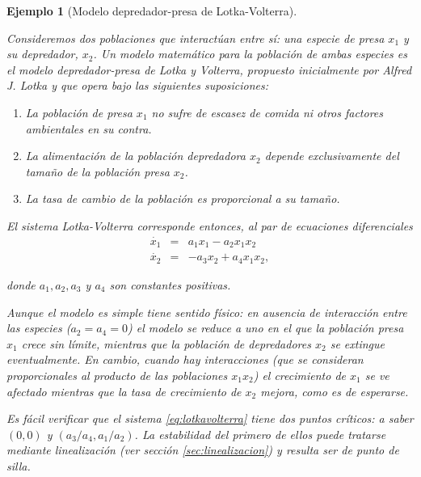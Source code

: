 \documentclass[11pt]{book}
\theoremstyle{definition}
\numberwithin{definition}{section}
\theoremstyle{theorem}
\numberwithin{theorem}{section}
\numberwithin{lemma}{section}
\numberwithin{corollary}{section}
\theoremstyle{plain}
\newtheorem{example}{Ejemplo}
\numberwithin{example}{section}
\begin{document}
\begin{example}[Modelo depredador-presa de Lotka-Volterra]\label{ex:lotkavolterra}

Consideremos dos poblaciones que interactúan entre sí: una especie de presa $x_1$ y su depredador, $x_2$. Un modelo matemático para la población de ambas especies es el modelo \emph{depredador-presa} de Lotka y Volterra, propuesto inicialmente por Alfred J. Lotka \cite{lotka10,lotka25,volterra} y que opera bajo las siguientes suposiciones:

\begin{enumerate}
	\item La población de presa $x_1$ no sufre de escasez de comida ni otros factores ambientales en su contra.
	\item La alimentación de la población depredadora $x_2$ depende exclusivamente del tamaño de la población presa $x_2$.
	\item La tasa de cambio de la población es proporcional a su tamaño.
\end{enumerate}

El sistema Lotka-Volterra corresponde entonces, al par de ecuaciones diferenciales
\begin{equation} \label{eq:lotkavolterra}
	\begin{array}{lll}
		\dot{x_1} & = & a_1x_1 - a_2x_1x_2 \\
		\dot{x_2} & = & -a_3x_2 + a_4x_1x_2,
	\end{array}
\end{equation}

donde $a_1, a_2, a_3$ y $a_4$ son constantes positivas.

Aunque el modelo es simple tiene sentido físico: en ausencia de interacción entre las especies ($a_2 = a_4 = 0$) el modelo se reduce a uno en el que la población presa $x_1$ crece sin límite, mientras que la población de depredadores $x_2$ se extingue eventualmente.
En cambio, cuando hay interacciones (que se consideran proporcionales al producto de las poblaciones $x_1x_2$) el crecimiento de $x_1$ se ve afectado mientras que la tasa de crecimiento de $x_2$ mejora, como es de esperarse.

\begin{figure}
\end{figure}

Es fácil verificar que el sistema \ref{eq:lotkavolterra} tiene dos puntos críticos: a saber $(0,0)$ y $(a_3 / a_4, a_1 / a_2)$.
La estabilidad del primero de ellos puede tratarse mediante linealización (ver sección \ref{sec:linealizacion}) y resulta ser de punto de silla.


\end{example}
\end{document}
